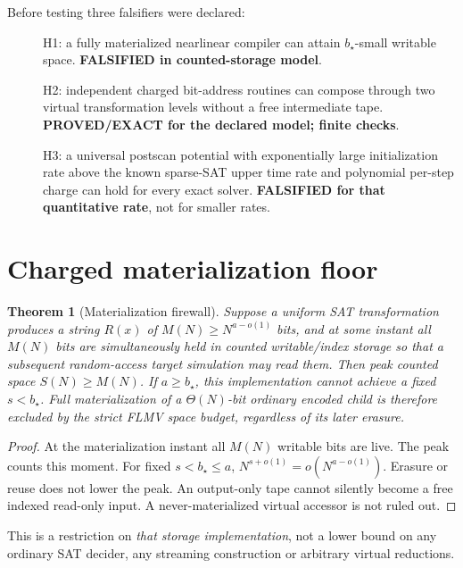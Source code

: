 \documentclass[11pt]{article}
\newtheorem{theorem}{Theorem}
\begin{document}
Before testing three falsifiers were declared:
\begin{description}
\item[] H1: a fully materialized nearlinear compiler can attain
$b_\star$-small writable space. \textbf{FALSIFIED in counted-storage model}.
\item[] H2: independent charged bit-address routines can compose through two
virtual transformation levels without a free intermediate tape.
\textbf{PROVED/EXACT for the declared model; finite checks}. 
\item[] H3: a universal postscan potential with exponentially large
initialization rate above the known sparse-SAT upper time rate
and polynomial per-step charge can hold for every exact solver.
\textbf{FALSIFIED for that quantitative rate}, not for smaller rates.
\end{description}

\section{Charged materialization floor}
\begin{theorem}[Materialization firewall]
Suppose a uniform SAT transformation produces a string $R(x)$ of
$M(N)\ge N^{a-o(1)}$ bits, and at some instant all $M(N)$ bits are
simultaneously held in counted writable/index storage so that a subsequent
random-access target simulation may read them. Then peak counted space
$S(N)\ge M(N)$. If $a\ge b_\star$, this implementation cannot achieve
a fixed $s<b_\star$. Full materialization of a $\Theta(N)$-bit
ordinary encoded child is therefore excluded by the strict FLMV space
budget, regardless of its later erasure.
\end{theorem}
\begin{proof}
At the materialization instant all $M(N)$ writable bits are live.
The peak counts this moment. For fixed $s<b_\star\le a$,
$N^{s+o(1)}=o(N^{a-o(1)})$. Erasure or reuse does not lower the peak.
An output-only tape cannot silently become a free indexed read-only
input. A never-materialized virtual accessor is not ruled out.
\end{proof}
This is a restriction on \emph{that storage implementation}, not
a lower bound on any ordinary SAT decider, any streaming construction
or arbitrary virtual reductions.
\end{document}

